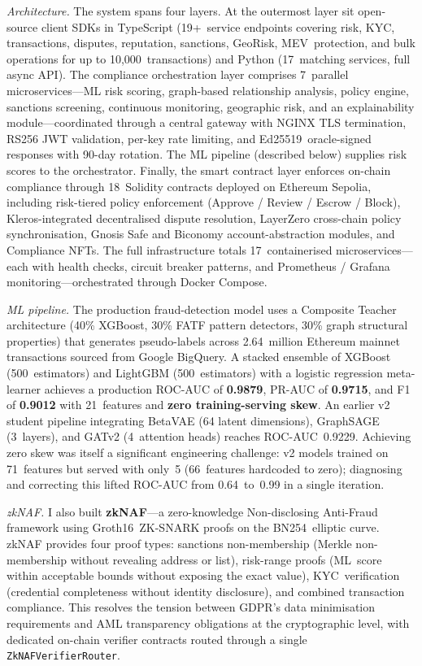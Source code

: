 \documentclass[12pt,a4paper]{article}
\begin{document}
\textit{Architecture.}\;
The system spans four layers.  At the outermost layer sit open-source
client SDKs in TypeScript (19+~service endpoints covering risk, KYC,
transactions, disputes, reputation, sanctions, GeoRisk, MEV~protection,
and bulk operations for up to 10,000~transactions) and Python
(17~matching services, full async API).  The compliance orchestration
layer comprises 7~parallel microservices---ML risk scoring, graph-based
relationship analysis, policy engine, sanctions screening, continuous
monitoring, geographic risk, and an explainability module---coordinated
through a central gateway with NGINX TLS termination, RS256 JWT
validation, per-key rate limiting, and Ed25519~oracle-signed responses
with 90-day rotation.  The ML pipeline (described below) supplies risk
scores to the orchestrator.  Finally, the smart contract layer enforces
on-chain compliance through 18~Solidity contracts deployed on Ethereum
Sepolia, including risk-tiered policy enforcement
(Approve / Review / Escrow / Block), Kleros-integrated decentralised
dispute resolution, LayerZero cross-chain policy synchronisation, Gnosis
Safe and Biconomy account-abstraction modules, and Compliance NFTs.  The
full infrastructure totals 17~containerised microservices---each with
health checks, circuit breaker patterns, and Prometheus / Grafana
monitoring---orchestrated through Docker Compose.

\textit{ML pipeline.}\;
The production fraud-detection model uses a Composite Teacher
architecture (40\% XGBoost, 30\% FATF pattern detectors, 30\% graph
structural properties) that generates pseudo-labels across
2.64~million Ethereum mainnet transactions sourced from Google BigQuery.
A stacked ensemble of XGBoost (500~estimators) and LightGBM
(500~estimators) with a logistic regression meta-learner achieves a
production ROC-AUC of \textbf{0.9879}, PR-AUC of \textbf{0.9715}, and
F1 of \textbf{0.9012} with 21~features and \textbf{zero
training-serving skew}.  An earlier v2 student pipeline integrating
BetaVAE (64 latent dimensions), GraphSAGE (3~layers), and GATv2
(4~attention heads) reaches ROC-AUC~0.9229.  Achieving zero skew was
itself a significant engineering challenge: v2 models trained on
71~features but served with only~5 (66~features hardcoded to zero);
diagnosing and correcting this lifted ROC-AUC from 0.64~to~0.99 in a
single iteration.

\textit{zkNAF.}\;
I also built \textbf{zkNAF}---a zero-knowledge Non-disclosing Anti-Fraud
framework using Groth16~ZK-SNARK proofs on the BN254~elliptic curve.
zkNAF provides four proof types: sanctions non-membership (Merkle
non-membership without revealing address or list), risk-range proofs
(ML~score within acceptable bounds without exposing the exact value),
KYC~verification (credential completeness without identity disclosure),
and combined transaction compliance.  This resolves the tension between
GDPR's data minimisation requirements and AML transparency obligations
at the cryptographic level, with dedicated on-chain verifier contracts
routed through a single \texttt{ZkNAFVerifierRouter}.
\end{document}
